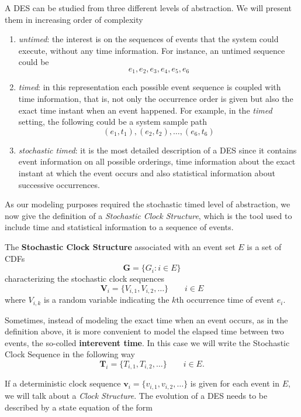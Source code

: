 A \gls{DES} can be studied from three different levels of abstraction. We will present them in increasing order of complexity
\begin{enumerate}
	\item \textit{untimed}: the interest is on the sequences of events that the system could execute, without any time information. For instance, an untimed sequence could be
	\[e_1, e_2, e_3, e_4, e_5, e_6 \]
	\item \textit{timed}: in this representation each possible event sequence is coupled with time information, that is, not only the occurrence order is given but also the exact time instant when an event happened. For example, in the \textit{timed} setting, the following could be a system sample path
	\[(e_1,t_1), (e_2,t_2), \ldots, (e_6,t_6) \]
	
	
	\item \textit{stochastic timed}: it is the most detailed description of a \gls{DES} since it contains event information on all possible orderings, time information about the exact instant at which the event occurs and also statistical information about successive occurrences.
\end{enumerate}
As our modeling purposes required the stochastic timed level of abstraction, we now give the definition of a \textit{Stochastic Clock Structure}, which is the tool used to include time and statistical information to a sequence of events.
\begin{definition}
	The \textbf{Stochastic Clock Structure} associated with an event set $E$ is a set of CDFs
	\[ \bm{G} = \{G_i \colon i \in E \}   \]
	characterizing the stochastic clock sequences
	\[ \bm{V}_{i} = \{V_{i,1},V_{i,2},\ldots \} \qquad i \in E \]
	where $V_{i,k}$ is a random variable indicating the $k$th occurrence time of event $e_i$.
\end{definition}
\begin{remark}
	Sometimes, instead of modeling the exact time when an event occurs, as in the definition above, it is more convenient to model the elapsed time between two events, the so-colled \textbf{interevent time}. In this case we will write the Stochastic Clock Sequence in the following way \[ \bm{T}_{i} = \{T_{i,1},T_{i,2},\ldots \} \qquad i \in E. \]
\end{remark}
If a deterministic clock sequence  $\bm{v}_i = \{v_{i,1}, v_{i,2},\ldots\}$ is given for each event in $E$, we will talk about a \textit{Clock Structure}. The evolution of a \gls{DES} needs to be described by a state equation of the form

